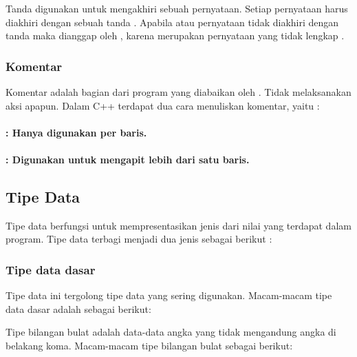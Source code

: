 \documentclass[../main.tex]{subfiles}
\begin{document}
\subsubsection{{\Semicolon}}
\begin{indentpar}\hpar{}
    Tanda {\semicolon} \citecode{;} digunakan untuk mengakhiri sebuah pernyataan. Setiap pernyataan harus diakhiri dengan sebuah tanda {\semicolon}. Apabila {\statement} atau pernyataan tidak diakhiri dengan tanda {\semicolon} maka dianggap {\error} oleh {\compiler}, karena merupakan pernyataan yang tidak lengkap \parencite{kadir2005heriyanto}.
\end{indentpar}

\subsubsection{Komentar}
\begin{indentpar}\hpar{}
    Komentar adalah bagian dari program yang diabaikan oleh {\compiler}. Tidak melaksanakan aksi apapun. Dalam C++ terdapat dua cara menuliskan komentar, yaitu \parencite{kadir2005heriyanto}:
\end{indentpar}

\paragraph{: Hanya digunakan per baris.}
\paragraph{: Digunakan untuk mengapit lebih dari satu baris.}

\subsection{Tipe Data}
Tipe data berfungsi untuk mempresentasikan jenis dari nilai yang terdapat dalam program. Tipe data terbagi menjadi dua jenis sebagai berikut \parencite{friyadi2005panduan}:

\subsubsection{Tipe data dasar}
\begin{indentpar}\hpar{}
    Tipe data ini tergolong tipe data yang sering digunakan. Macam-macam tipe data dasar adalah sebagai berikut:
\end{indentpar}
\newpage
{}
\begin{indentpar}[n]\hpar{}
    Tipe bilangan bulat adalah data-data angka yang tidak mengandung angka di belakang koma. Macam-macam tipe bilangan bulat sebagai berikut:
\end{indentpar}
\end{document}
